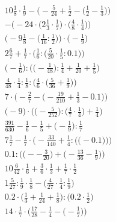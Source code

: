 \documentclass[8pt]{article}
\begin{document}
\begin{align}
10\frac{1}{8} \cdot \frac{1}{9} - \Big(-\frac{5}{24} + \frac{1}{2} - \big(\frac{1}{2} - \frac{1}{3}\big)\Big) \\
-\Big(-24 \cdot \big(2\frac{1}{3} \cdot \frac{1}{7}\big) \cdot \big(\frac{4}{8} \cdot \frac{1}{4}\big)\Big) \\
\Big(-9\frac{1}{8} - \big(\frac{1}{16} : \frac{1}{2}\big)\Big) \cdot \Big(-\frac{1}{9}\Big) \\
2\frac{6}{7} + \frac{1}{7} \cdot \Big(\frac{1}{6} : \big(\frac{5}{20} \cdot \frac{1}{5} : 0.1\big)\Big) \\
\Big(-\frac{1}{6}\Big) : \Big(\big(-\frac{1}{48}\big) : \frac{1}{4} + \frac{1}{20} + \frac{1}{5}\Big) \\
\frac{4}{48} \cdot \frac{1}{4} : \frac{1}{8} : \Big(\frac{4}{6} \cdot \big(\frac{5}{36} + \frac{1}{9}\big)\Big) \\
7 \cdot \Big(-\frac{2}{7} - \big(-\frac{19}{210} + \frac{1}{3} - 0.1\big)\Big) \\
\Big(-9\Big) \cdot \Big(\big(-\frac{5}{252}\big) : \big(\frac{4}{7} \cdot \frac{1}{4}\big) + \frac{1}{4}\Big) \\
\frac{391}{630} - \frac{1}{6} - \frac{1}{5} + \big(-\frac{1}{9}\big) : \frac{1}{7} \\
7\frac{1}{7} - \frac{1}{7} \cdot \bigg(-\frac{33}{140} + \frac{1}{4} : \Big(\big(-0.1\big)\Big)\bigg) \\
0.1 : \Big(\big(--\frac{3}{20}\big) + \big(-\frac{13}{36} - \frac{1}{9}\big)\Big) \\
10\frac{6}{42} \cdot \frac{1}{6} + \frac{3}{6} \cdot \frac{1}{3} + \frac{1}{7} \cdot \frac{1}{2} \\
1\frac{5}{27} : \frac{1}{9} \cdot \frac{1}{8} - \big(\frac{4}{27} \cdot \frac{1}{4} : \frac{1}{9}\big) \\
0.2 \cdot \big(\frac{1}{3} + \frac{1}{24} + \frac{1}{8}\big) : \big(0.2 \cdot \frac{1}{2}\big) \\
14 \cdot \frac{1}{7} \cdot \Big(\frac{17}{28} - \frac{1}{4} - \big(-\frac{1}{7}\big)\Big)
\end{align}
\end{document}
